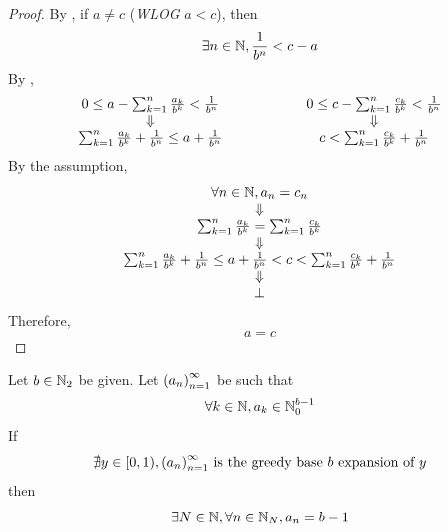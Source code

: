 \begin{proof}
    By , if $a \neq c$ (\emph{WLOG} $a < c$), then
    \[
    \exists n \in \N, \frac{1}{b^{n}} < c - a
    \]
    By ,
    \[
    \begin{array}{c@{\qquad\qquad\qquad}c}
        0 \leq a - \sum_{k = 1}^{n} \frac{a_{k}}{b^{k}} < \frac{1}{b^{n}} &
        0 \leq c - \sum_{k = 1}^{n} \frac{c_{k}}{b^{k}} < \frac{1}{b^{n}} \\
        \Downarrow & \Downarrow \\
        \sum_{k = 1}^{n} \frac{a_{k}}{b^{k}} + \frac{1}{b^{n}} \leq a + \frac{1}{b^{n}} &
        c < \sum_{k = 1}^{n} \frac{c_{k}}{b^{k}} + \frac{1}{b^{n}} \\
    \end{array}
    \]
    By the assumption,
    \[
    \begin{array}{c}
        \forall n \in \N, a_{n} = c_{n} \\
        \Downarrow \\
        \sum_{k = 1}^{n} \frac{a_{k}}{b^{k}} = \sum_{k = 1}^{n} \frac{c_{k}}{b^{k}} \\
        \Downarrow \\
        \sum_{k = 1}^{n} \frac{a_{k}}{b^{k}} + \frac{1}{b^{n}} \leq a + \frac{1}{b^{n}}
        < c < \sum_{k = 1}^{n} \frac{c_{k}}{b^{k}} + \frac{1}{b^{n}} \\
        \Downarrow \\
        \bot
    \end{array}
    \]
    Therefore,
    \[
    a = c
    \]
\end{proof}

\bigskip

\begin{theorem} \label{an:thm:no-real-number-matching-greedy-base-expansion}
    Let $b \in \N_{2}$ be given. Let $\paren*{a_{n}}_{n = 1}^{\infty}$ be such that
    \[
    \forall k \in \N, a_{k} \in \N_{0}^{b - 1}
    \]
    If
    \[
    \nexists y \in [0, 1), \paren*{a_{n}}_{n = 1}^{\infty} \text{ is the greedy base $b$ expansion of $y$}
    \]
    then
    \[
    \exists N \in \N, \forall n \in \N_{N}, a_{n} = b - 1
    \]
\end{theorem}

